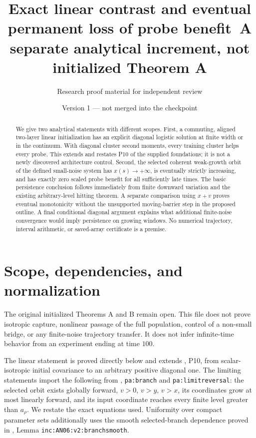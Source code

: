 \documentclass[11pt]{article}
\title{Exact linear contrast and eventual permanent loss of probe benefit\
\large A separate analytical increment, not initialized Theorem A}
\author{Research proof material for independent review}
\date{Version 1 --- not merged into the checkpoint}
\numberwithin{equation}{section}
\theoremstyle{remark}\newtheorem{remark}[theorem]{Remark}
\begin{document}
\maketitle

\begin{abstract}
We give two analytical statements with different scopes. First, a commuting,
aligned two-layer linear initialization has an explicit diagonal logistic
solution at finite width or in the continuum. With diagonal cluster second
moments, every training cluster helps every probe. This extends and restates
P10 of the supplied foundations; it is not a newly discovered architecture
control. Second, the selected coherent weak-growth orbit of the defined
small-noise system has $x(s)\to+\infty$, is eventually strictly increasing,
and has exactly zero scaled probe benefit for all sufficiently late times.
The basic persistence conclusion follows immediately from finite downward
variation and the existing arbitrary-level hitting theorem. A separate
comparison using $x+v$ proves eventual monotonicity without the unsupported
moving-barrier step in the proposed outline. A final conditional diagonal
argument explains what additional finite-noise convergence would imply
persistence on growing windows. No numerical trajectory, interval arithmetic,
or saved-array certificate is a premise.
\end{abstract}

\section{Scope, dependencies, and normalization}
\label{inc:LP:v1:scope}

The original initialized Theorems A and B remain open. This file does not
prove isotropic capture, nonlinear passage of the full population, control
of a non-small bridge, or any finite-noise trajectory transfer. It does not
infer infinite-time behavior from an experiment ending at time $100$.

The linear statement is proved directly below and extends \cite{F}, P10,
from scalar-isotropic initial covariance to an arbitrary positive diagonal
one. The limiting statements import the following from \cite{P},
\texttt{pa:branch} and \texttt{pa:limitreversal}: the selected orbit exists
globally forward, $v>0$, $v>y$, $v>x$, its coordinates grow at most linearly
forward, and its input coordinate reaches every finite level greater than
$a_\rho$. We restate the exact equations used. Uniformity over compact
parameter sets additionally uses the smooth selected-branch dependence
proved in \cite{W}, Lemma \texttt{inc:AN06:v2:branchsmooth}.
\end{document}
